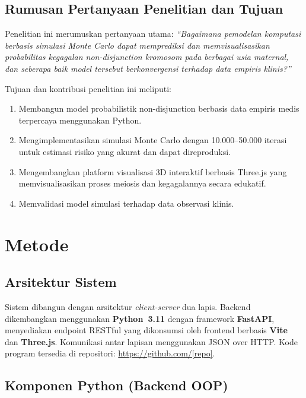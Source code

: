 \documentclass[10pt,a4paper,twocolumn]{article}
\begin{document}
\subsection{Rumusan Pertanyaan Penelitian dan Tujuan}

Penelitian ini merumuskan pertanyaan utama: \textit{``Bagaimana pemodelan komputasi
berbasis simulasi Monte Carlo dapat memprediksi dan memvisualisasikan probabilitas
kegagalan non-disjunction kromosom pada berbagai usia maternal, dan seberapa baik
model tersebut berkonvergensi terhadap data empiris klinis?''}

Tujuan dan kontribusi penelitian ini meliputi:

\begin{enumerate}[leftmargin=*,noitemsep,topsep=2pt]
    \item Membangun model probabilistik non-disjunction berbasis data empiris medis
        terpercaya menggunakan Python.
    \item Mengimplementasikan simulasi Monte Carlo dengan 10.000--50.000 iterasi
        untuk estimasi risiko yang akurat dan dapat direproduksi.
    \item Mengembangkan platform visualisasi 3D interaktif berbasis Three.js
        yang memvisualisasikan proses meiosis dan kegagalannya secara edukatif.
    \item Memvalidasi model simulasi terhadap data observasi klinis.
\end{enumerate}

\section{Metode}

\subsection{Arsitektur Sistem}

Sistem dibangun dengan arsitektur \textit{client-server} dua lapis.
Backend dikembangkan menggunakan \textbf{Python~3.11} dengan framework \textbf{FastAPI},
menyediakan endpoint RESTful yang dikonsumsi oleh frontend berbasis \textbf{Vite} dan
\textbf{Three.js}. Komunikasi antar lapisan menggunakan JSON over HTTP.
Kode program tersedia di repositori: \url{https://github.com/[repo]}.

\subsection{Komponen Python (Backend OOP)}
\end{document}
